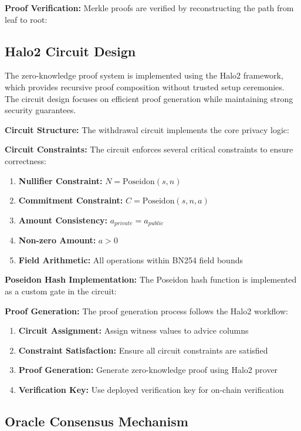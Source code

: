 \documentclass[11pt,a4paper]{article}
\begin{document}
\textbf{Proof Verification:}
Merkle proofs are verified by reconstructing the path from leaf to root:


\subsection{Halo2 Circuit Design}

The zero-knowledge proof system is implemented using the Halo2 framework, which provides recursive proof composition without trusted setup ceremonies. The circuit design focuses on efficient proof generation while maintaining strong security guarantees.

\textbf{Circuit Structure:}
The withdrawal circuit implements the core privacy logic:


\textbf{Circuit Constraints:}
The circuit enforces several critical constraints to ensure correctness:

\begin{enumerate}
    \item \textbf{Nullifier Constraint:} $N = \text{Poseidon}(s, n)$
    \item \textbf{Commitment Constraint:} $C = \text{Poseidon}(s, n, a)$
    \item \textbf{Amount Consistency:} $a_{private} = a_{public}$
    \item \textbf{Non-zero Amount:} $a > 0$
    \item \textbf{Field Arithmetic:} All operations within BN254 field bounds
\end{enumerate}

\textbf{Poseidon Hash Implementation:}
The Poseidon hash function is implemented as a custom gate in the circuit:


\textbf{Proof Generation:}
The proof generation process follows the Halo2 workflow:

\begin{enumerate}
    \item \textbf{Circuit Assignment:} Assign witness values to advice columns
    \item \textbf{Constraint Satisfaction:} Ensure all circuit constraints are satisfied
    \item \textbf{Proof Generation:} Generate zero-knowledge proof using Halo2 prover
    \item \textbf{Verification Key:} Use deployed verification key for on-chain verification
\end{enumerate}

\subsection{Oracle Consensus Mechanism}
\end{document}
